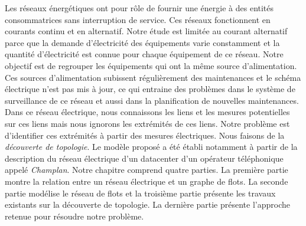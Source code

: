 Les r\'eseaux \'energ\'etiques ont pour r\^ole de fournir une \'energie \`a des entit\'es consommatrices sans interruption de service. Ces r\'eseaux fonctionnent en courants continu et en alternatif.
\newline
Notre \'etude est limit\'ee au courant alternatif parce que la demande d'\'electricit\'e des \'equipements varie constamment et la quantit\'e d'\'electricit\'e est connue pour chaque \'equipement de ce r\'eseau. 
Notre objectif est de regrouper les \'equipements qui ont la m\^eme source d'alimentation.
Ces sources d'alimentation subissent r\'eguli\`erement des maintenances et le sch\'ema \'electrique n'est pas mis \`a jour, ce qui entraine des probl\`emes dans le syst\`eme de surveillance de ce r\'eseau et aussi dans la planification de nouvelles maintenances.
\newline
Dans ce r\'eseau \'electrique, nous connaissons les liens et les mesures potentielles sur ces liens mais nous ignorons les extr\'emit\'es de ces liens. Notre probl\`eme est d'identifier ces extr\'emit\'es \`a partir des mesures \'electriques. Nous faisons de la {\em d\'ecouverte de topologie}.  
Le mod\`ele propos\'e a \'et\'e \'etabli notamment \`a partir de la description du r\'eseau \'electrique d'un datacenter d'un op\'erateur t\'el\'ephonique appel\'e {\em Champlan}.
 \newline
Notre chapitre comprend quatre parties. La premi\`ere partie montre la relation entre un r\'eseau \'electrique et un graphe de flots. La seconde partie mod\'elise le r\'eseau de flots et la troisi\`eme partie pr\'esente les travaux existants sur la d\'ecouverte de topologie. 
La derni\`ere partie pr\'esente l'approche retenue pour r\'esoudre notre probl\`eme.

